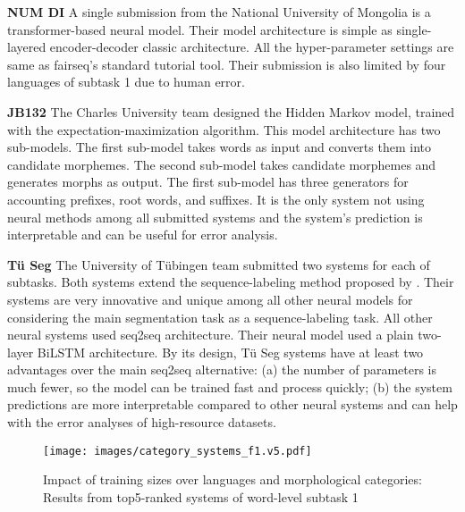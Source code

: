 \documentclass[11pt]{article}
\begin{document}
\vspace{1em} \noindent \textbf{NUM DI} A single submission from the National University of Mongolia \cite{Task2_NUMDI} is a transformer-based neural model. Their model architecture is simple as single-layered encoder-decoder classic architecture. All the hyper-parameter settings are same as fairseq's standard tutorial tool. Their submission is also limited by four languages of subtask 1 due to human error.

\vspace{1em} \noindent \textbf{JB132} The Charles University team \cite{JB132} designed the Hidden Markov model, trained with the expectation-maximization algorithm. This model architecture has two sub-models. The first sub-model takes words as input and converts them into candidate morphemes. The second sub-model takes candidate morphemes and generates morphs as output. The first sub-model has three generators for accounting prefixes, root words, and suffixes. It is the only system not using neural methods among all submitted systems and the system's prediction is interpretable and can be useful for error analysis.

\vspace{1em} \noindent \textbf{Tü Seg} The University of Tübingen \cite{Task2-TueSeg} team submitted two systems for each of subtasks. Both systems extend the sequence-labeling method proposed by \cite{hellwig2018sanskrit,li2022word}. Their systems are very innovative and unique among all other neural models for considering the main segmentation task as a sequence-labeling task. All other neural systems used seq2seq architecture. Their neural model used a plain two-layer BiLSTM architecture. By its design, Tü Seg systems have at least two advantages over the main seq2seq alternative: (a) the number of parameters is much fewer, so the model can be trained fast and process quickly; (b) the system predictions are more interpretable compared to other neural systems and can help with the error analyses of high-resource datasets.  

\begin{figure*}[!h]
\begin{center}
\texttt{[image: images/category\_systems\_f1.v5.pdf]}
\caption{Impact of training sizes over languages and morphological categories: Results from top5-ranked systems of word-level subtask 1}
\label{fig:size}
\end{center}
\end{figure*}
\end{document}
